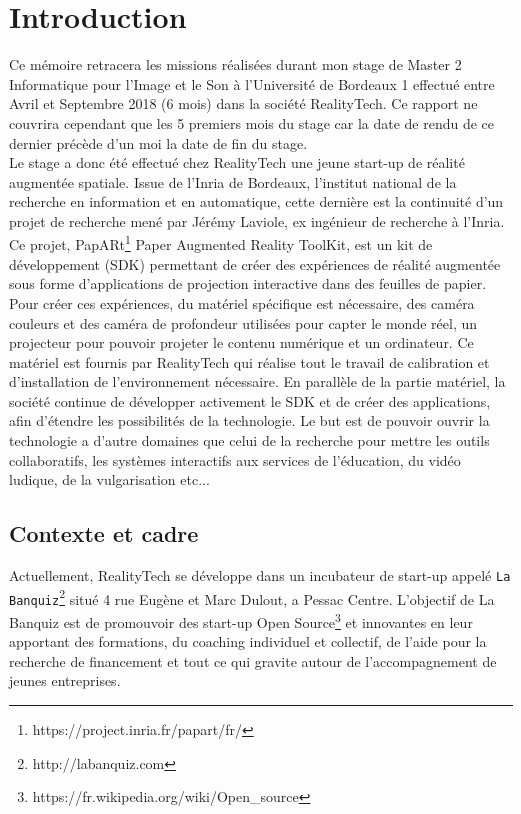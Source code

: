 \chapter{Introduction}

Ce mémoire retracera les missions réalisées durant mon stage de Master 2 Informatique pour l'Image et le Son à l'Université de Bordeaux 1 effectué entre Avril et Septembre 2018 (6 mois) dans la société RealityTech. Ce rapport ne couvrira cependant que les 5 premiers mois du stage car la date de rendu de ce dernier précède d'un moi la date de fin du stage.\\

Le stage a donc été effectué chez RealityTech une jeune start-up de réalité augmentée spatiale. Issue de l'Inria de Bordeaux, l'institut national de la recherche en information et en automatique, cette dernière est la continuité d'un projet de recherche mené par Jérémy Laviole, ex ingénieur de recherche à l'Inria. Ce projet, PapARt\footnote{https://project.inria.fr/papart/fr/} Paper Augmented Reality ToolKit, est un kit de développement (SDK) permettant de créer des expériences de réalité augmentée sous forme d'applications de projection interactive dans des feuilles de papier. Pour créer ces expériences, du matériel spécifique est nécessaire, des caméra couleurs et des caméra de profondeur utilisées pour capter le monde réel, un projecteur pour pouvoir projeter le contenu numérique et un ordinateur. Ce matériel est fournis par RealityTech qui réalise tout le travail de calibration et d'installation de l'environnement nécessaire. En parallèle de la partie matériel, la société continue de développer activement le SDK et de créer des applications, afin d'étendre les possibilités de la technologie. Le but est de pouvoir ouvrir la technologie a d'autre domaines que celui de la recherche pour mettre les outils collaboratifs, les systèmes interactifs aux services de l'éducation, du vidéo ludique, de la vulgarisation etc...

\section{Contexte et cadre}
\label{sec:contexte}
Actuellement, RealityTech se développe dans un incubateur de start-up appelé \texttt{La Banquiz}\footnote{http://labanquiz.com} situé 4 rue Eugène et Marc Dulout, a Pessac Centre. L'objectif de La Banquiz est de promouvoir des start-up Open Source\footnote{https://fr.wikipedia.org/wiki/Open\_source} et innovantes en leur apportant des formations, du coaching individuel et collectif, de l'aide pour la recherche de financement et tout ce qui gravite autour de l'accompagnement de jeunes entreprises.\\

